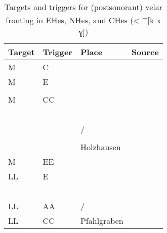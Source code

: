 \begin{table}
\small
\caption{Targets and triggers for (postsonorant) velar fronting in EHes, NHes, and CHes (< \textsuperscript{+}[k x ɣ])\label{tab:12.8}}
\begin{tabularx}{\textwidth}{llQQ}
\lsptoprule
Target & Trigger & Place & Source\\\midrule
M & C &   & \citet{Bromm1936}\\
M & E &    & \citet{Schaefer1907}\\
  &   &   & \citet{Hofmann1926}\\
M & CC &                     & \citet{Hertel1888}    \\
  &    &                          &\citet{Reuss1907}       \\
  &    &                         &\citet{Hackler1914}     \\
  &    &                       &\citet{Hofmann1940}     \\
  &    &                         &\citet{Martin1942}      \\
  &    &                      &\citet{Martin1942}      \\
  &    &  /       &\citet{Möhn1962}        \\
  &    &                            &\citet{Spenter1964}     \\
  &    &  Holzhausen                             &\citet{Arend1991}\\
M & EE &   & \citet{BethgeBonnin1969}\\
LL & E &       & \citet{Salzmann1888}\\
  &    &                 &\citet{Urff1926}      \\
  &    &       &\citet{Weber1959}     \\
  &    &         &\citet{Krafft1969}    \\
  &    &    &\citet{Hasselbach1971}\\
  &    &         &\citet{Hasselberg1979}\\
LL & AA &  / & \citet{Knauss1906}\\
LL & CC & Pfahlgraben           & \citet{Faber1912} \\

\end{tabularx}
\end{table}
